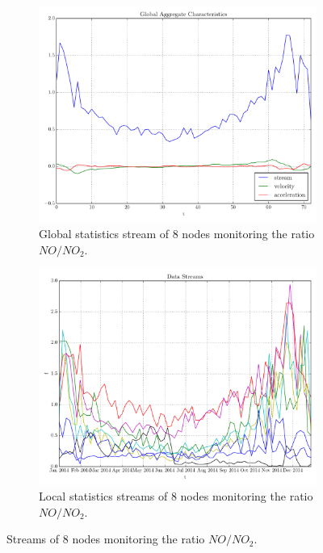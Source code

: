 \begin{figure}[!htb]
\centering
\begin{subfigure}[t]{0.49\textwidth}
\centering
\includegraphics[scale=0.38, trim=2cm 0 0 0]{img/AT_NO2_NO_2014_8N_global.pdf}
\caption{Global statistics stream of 8 nodes monitoring the ratio $NO/NO_2$.}
\end{subfigure}
\begin{subfigure}[t]{0.49\textwidth}
\centering
\includegraphics[scale=0.38]{img/AT_NO2_NO_2014_8N_streams.pdf}
\caption{Local statistics streams of 8 nodes monitoring the ratio $NO/NO_2$.} 
\end{subfigure}
\vspace{0.5cm}
\caption{Streams of 8 nodes monitoring the ratio $NO/NO_2$.}\label{fig:NO2_NO}
\end{figure}

